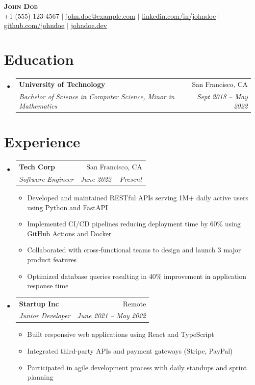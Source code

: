 \documentclass[letterpaper,11pt]{article}
\makeatletter
\newcommand{\resumeItem}[1]{
  \item\small{
    {#1 \vspace{-2pt}}
  }
}
\newcommand{\resumeSubheading}[4]{
  \vspace{-2pt}\item
    \begin{tabular*}{0.97\textwidth}[t]{l@{\extracolsep{\fill}}r}
      \textbf{#1} & #2 \\
      \textit{\small#3} & \textit{\small #4} \\
    \end{tabular*}\vspace{-7pt}
}
\newcommand{\resumeSubHeadingListStart}{\begin{itemize}[leftmargin=0.15in, label={}]}
\newcommand{\resumeSubHeadingListEnd}{\end{itemize}}
\newcommand{\resumeItemListStart}{\begin{itemize}}
\newcommand{\resumeItemListEnd}{\end{itemize}\vspace{-5pt}}
\makeatother
\begin{document}
\begin{center}
    \textbf{\Huge \scshape John Doe} \\ \vspace{1pt}
    \small +1 (555) 123-4567 $|$ \href{mailto:john.doe@example.com}{\underline{john.doe@example.com}} $|$ \href{https://linkedin.com/in/johndoe}{\underline{linkedin.com/in/johndoe}} $|$ \href{https://github.com/johndoe}{\underline{github.com/johndoe}} $|$ \href{https://johndoe.dev}{\underline{johndoe.dev}}
\end{center}


\section{Education}
  \resumeSubHeadingListStart
    \resumeSubheading
      {University of Technology}{San Francisco, CA}
      {Bachelor of Science in Computer Science, Minor in Mathematics}{Sept 2018 -- May 2022}
  \resumeSubHeadingListEnd


\section{Experience}
  \resumeSubHeadingListStart
    \resumeSubheading
      {Tech Corp}{San Francisco, CA}
      {Software Engineer}{June 2022 -- Present}
      \resumeItemListStart
        \resumeItem{Developed and maintained RESTful APIs serving 1M+ daily active users using Python and FastAPI}
        \resumeItem{Implemented CI/CD pipelines reducing deployment time by 60\% using GitHub Actions and Docker}
        \resumeItem{Collaborated with cross-functional teams to design and launch 3 major product features}
        \resumeItem{Optimized database queries resulting in 40\% improvement in application response time}
      \resumeItemListEnd
    \resumeSubheading
      {Startup Inc}{Remote}
      {Junior Developer}{June 2021 -- May 2022}
      \resumeItemListStart
        \resumeItem{Built responsive web applications using React and TypeScript}
        \resumeItem{Integrated third-party APIs and payment gateways (Stripe, PayPal)}
        \resumeItem{Participated in agile development process with daily standups and sprint planning}
      \resumeItemListEnd
  \resumeSubHeadingListEnd


\end{document}
